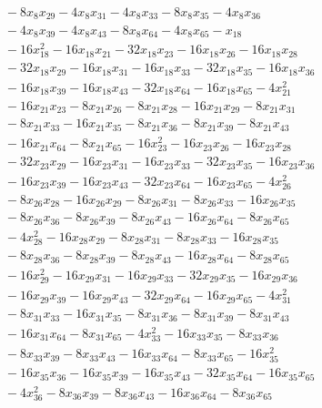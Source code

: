 \begin{align*}
&\quad{} -8x_{8}x_{29} -4x_{8}x_{31} -4x_{8}x_{33} -8x_{8}x_{35} -4x_{8}x_{36} \\
&\quad{} -4x_{8}x_{39} -4x_{8}x_{43} -8x_{8}x_{64} -4x_{8}x_{65} -x_{18} \\
&\quad{} -16x_{18}^{2} -16x_{18}x_{21} -32x_{18}x_{23} -16x_{18}x_{26} -16x_{18}x_{28} \\
&\quad{} -32x_{18}x_{29} -16x_{18}x_{31} -16x_{18}x_{33} -32x_{18}x_{35} -16x_{18}x_{36} \\
&\quad{} -16x_{18}x_{39} -16x_{18}x_{43} -32x_{18}x_{64} -16x_{18}x_{65} -4x_{21}^{2} \\
&\quad{} -16x_{21}x_{23} -8x_{21}x_{26} -8x_{21}x_{28} -16x_{21}x_{29} -8x_{21}x_{31} \\
&\quad{} -8x_{21}x_{33} -16x_{21}x_{35} -8x_{21}x_{36} -8x_{21}x_{39} -8x_{21}x_{43} \\
&\quad{} -16x_{21}x_{64} -8x_{21}x_{65} -16x_{23}^{2} -16x_{23}x_{26} -16x_{23}x_{28} \\
&\quad{} -32x_{23}x_{29} -16x_{23}x_{31} -16x_{23}x_{33} -32x_{23}x_{35} -16x_{23}x_{36} \\
&\quad{} -16x_{23}x_{39} -16x_{23}x_{43} -32x_{23}x_{64} -16x_{23}x_{65} -4x_{26}^{2} \\
&\quad{} -8x_{26}x_{28} -16x_{26}x_{29} -8x_{26}x_{31} -8x_{26}x_{33} -16x_{26}x_{35} \\
&\quad{} -8x_{26}x_{36} -8x_{26}x_{39} -8x_{26}x_{43} -16x_{26}x_{64} -8x_{26}x_{65} \\
&\quad{} -4x_{28}^{2} -16x_{28}x_{29} -8x_{28}x_{31} -8x_{28}x_{33} -16x_{28}x_{35} \\
&\quad{} -8x_{28}x_{36} -8x_{28}x_{39} -8x_{28}x_{43} -16x_{28}x_{64} -8x_{28}x_{65} \\
&\quad{} -16x_{29}^{2} -16x_{29}x_{31} -16x_{29}x_{33} -32x_{29}x_{35} -16x_{29}x_{36} \\
&\quad{} -16x_{29}x_{39} -16x_{29}x_{43} -32x_{29}x_{64} -16x_{29}x_{65} -4x_{31}^{2} \\
&\quad{} -8x_{31}x_{33} -16x_{31}x_{35} -8x_{31}x_{36} -8x_{31}x_{39} -8x_{31}x_{43} \\
&\quad{} -16x_{31}x_{64} -8x_{31}x_{65} -4x_{33}^{2} -16x_{33}x_{35} -8x_{33}x_{36} \\
&\quad{} -8x_{33}x_{39} -8x_{33}x_{43} -16x_{33}x_{64} -8x_{33}x_{65} -16x_{35}^{2} \\
&\quad{} -16x_{35}x_{36} -16x_{35}x_{39} -16x_{35}x_{43} -32x_{35}x_{64} -16x_{35}x_{65} \\
&\quad{} -4x_{36}^{2} -8x_{36}x_{39} -8x_{36}x_{43} -16x_{36}x_{64} -8x_{36}x_{65} \\

\end{align*}
